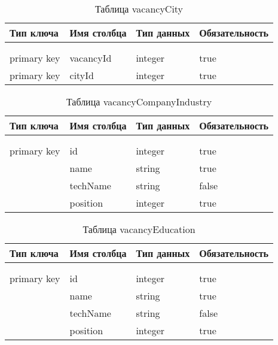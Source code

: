 \begin{xltabular}{\textwidth}{|l|l|p{1.7cm}|X|}
	\caption{Таблица vacancyCity \label{vacancyCity:table}}\\ \hline
	\centrow Тип ключа & \centrow Имя столбца & \centrow Тип данных & \centrow Обязательность \\ \hline
	 &  &  &  \\ \hline
	\endfirsthead
	 &  &  &  \\ \hline
	\finishhead
	primary key & vacancyId & integer & true \\ \hline 
	primary key & cityId & integer & true \\ \hline
\end{xltabular}

\begin{xltabular}{\textwidth}{|l|l|p{1.7cm}|X|}
	\caption{Таблица vacancyCompanyIndustry \label{vacancyCompanyIndustry:table}}\\ \hline
	\centrow Тип ключа & \centrow Имя столбца & \centrow Тип данных & \centrow Обязательность \\ \hline
	 &  &  &  \\ \hline
	\endfirsthead
	 &  &  &  \\ \hline
	\finishhead
	primary key & id & integer & true \\ \hline 
	& name & string & true \\ \hline 
	& techName & string & false \\ \hline 
	& position & integer & true \\ \hline
\end{xltabular}

\begin{xltabular}{\textwidth}{|l|l|p{1.7cm}|X|}
	\caption{Таблица vacancyEducation \label{vacancyEducation:table}}\\ \hline
	\centrow Тип ключа & \centrow Имя столбца & \centrow Тип данных & \centrow Обязательность \\ \hline
	 &  &  &  \\ \hline
	\endfirsthead
	 &  &  &  \\ \hline
	\finishhead
	primary key & id & integer & true \\ \hline 
	& name & string & true \\ \hline 
	& techName & string & false \\ \hline 
	& position & integer & true \\ \hline
\end{xltabular}

